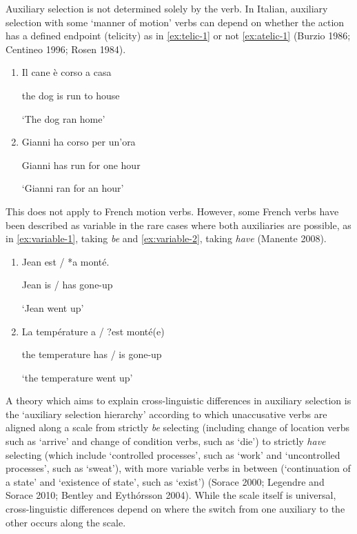 \documentclass[
  12pt,
]{article}
\begin{document}
Auxiliary selection is not determined solely by the verb. In Italian, auxiliary selection with some `manner of motion' verbs can depend on whether the action has a defined endpoint (telicity) as in \ref{ex:telic-1} or not \ref{ex:atelic-1} (Burzio 1986; Centineo 1996; Rosen 1984).

\begin{enumerate}[resume*]
\item Il cane è corso a casa    \label{ex:telic-1}

      the dog is run to house

      `The dog ran home'
    
\item  Gianni ha corso per un’ora    \label{ex:atelic-1}
      
      Gianni has run for one hour
      
      `Gianni ran for an hour'
\end{enumerate}

This does not apply to French motion verbs. However, some French verbs have been described as variable in the rare cases where both auxiliaries are possible, as in \ref{ex:variable-1}, taking \emph{be} and \ref{ex:variable-2}, taking \emph{have} (Manente 2008).

\begin{enumerate}[resume*]
\item Jean est / *a monté.    \label{ex:variable-1}

      Jean is / has gone-up
      
      `Jean went up'
      
\item La température a / ?est monté(e)  \label{ex:variable-2}

      the temperature has / is gone-up
      
      `the temperature went up'
\end{enumerate}

A theory which aims to explain cross-linguistic differences in auxiliary selection is the `auxiliary selection hierarchy' according to which unaccusative verbs are aligned along a scale from strictly \emph{be} selecting (including change of location verbs such as `arrive' and change of condition verbs, such as `die') to strictly \emph{have} selecting (which include `controlled processes', such as `work' and `uncontrolled processes', such as `sweat'), with more variable verbs in between (`continuation of a state' and `existence of state', such as `exist') (Sorace 2000; Legendre and Sorace 2010; Bentley and Eythórsson 2004). While the scale itself is universal, cross-linguistic differences depend on where the switch from one auxiliary to the other occurs along the scale.
\end{document}
